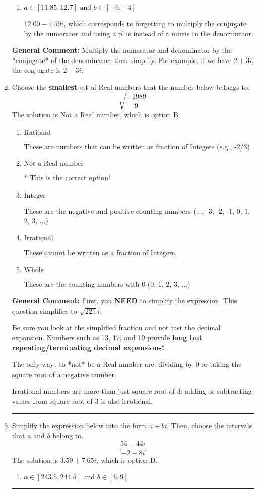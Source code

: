 \documentclass{extbook}[14pt]
\newcommand{\litem}[1]{\item #1

\rule{\textwidth}{0.4pt}}
\begin{document}
\begin{enumerate}
{\begin{enumerate}[label=\Alph*.]
 $-4.57  + 0.50 i$, which corresponds to forgetting to multiply the conjugate by the numerator and not computing the conjugate correctly.
\item \( a \in [11.85, 12.7] \text{ and } b \in [-6, -4] \)

 $12.00  - 4.59 i$, which corresponds to forgetting to multiply the conjugate by the numerator and using a plus instead of a minus in the denominator.
\end{enumerate}

\textbf{General Comment:} Multiply the numerator and denominator by the *conjugate* of the denominator, then simplify. For example, if we have $2+3i$, the conjugate is $2-3i$.
}
\litem{
Choose the \textbf{smallest} set of Real numbers that the number below belongs to.
\[ \sqrt{\frac{-1989}{9}} \]The solution is \( \text{Not a Real number} \), which is option B.\begin{enumerate}[label=\Alph*.]
\item \( \text{Rational} \)

These are numbers that can be written as fraction of Integers (e.g., -2/3)
\item \( \text{Not a Real number} \)

* This is the correct option!
\item \( \text{Integer} \)

These are the negative and positive counting numbers (..., -3, -2, -1, 0, 1, 2, 3, ...)
\item \( \text{Irrational} \)

These cannot be written as a fraction of Integers.
\item \( \text{Whole} \)

These are the counting numbers with 0 (0, 1, 2, 3, ...)
\end{enumerate}

\textbf{General Comment:} First, you \textbf{NEED} to simplify the expression. This question simplifies to $\sqrt{221} i$. 
 
 Be sure you look at the simplified fraction and not just the decimal expansion. Numbers such as 13, 17, and 19 provide \textbf{long but repeating/terminating decimal expansions!} 
 
 The only ways to *not* be a Real number are: dividing by 0 or taking the square root of a negative number. 
 
 Irrational numbers are more than just square root of 3: adding or subtracting values from square root of 3 is also irrational.
}
\litem{
Simplify the expression below into the form $a+bi$. Then, choose the intervals that $a$ and $b$ belong to.
\[ \frac{54 - 44 i}{-2 - 8 i} \]The solution is \( 3.59  + 7.65 i \), which is option D.\begin{enumerate}[label=\Alph*.]
\item \( a \in [243.5, 244.5] \text{ and } b \in [6, 9] \)


\end{enumerate}}
\end{enumerate}
\end{document}
